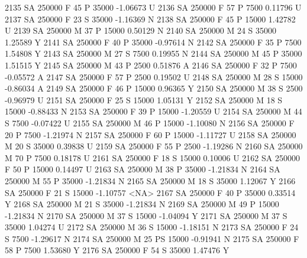 \documentclass{article}
\begin{document}
\begin{Schunk}
\begin{Soutput}
2135     SA     250000   F  45         P  35000  -1.06673    U
2136     SA     250000   F  57         P   7500   0.11796    U
2137     SA     250000   F  23         S  35000  -1.16369    N
2138     SA     250000   F  45         P  15000   1.42782    U
2139     SA     250000   M  37         P  15000   0.50129    N
2140     SA     250000   M  24         S  35000   1.25589    Y
2141     SA     250000   F  40         P  35000  -0.97614    N
2142     SA     250000   F  35         P   7500   1.54808    Y
2143     SA     250000   M  27         S   7500   0.19955    N
2144     SA     250000   M  45         P  35000   1.51515    Y
2145     SA     250000   M  43         P   2500   0.51876    A
2146     SA     250000   F  32         P   7500  -0.05572    A
2147     SA     250000   F  57         P   2500   0.19502    U
2148     SA     250000   M  28         S  15000  -0.86034    A
2149     SA     250000   F  46         P  15000   0.96365    Y
2150     SA     250000   M  38         S   2500  -0.96979    U
2151     SA     250000   F  25         S  15000   1.05131    Y
2152     SA     250000   M  18         S  15000  -0.88433    N
2153     SA     250000   F  39         P  15000  -1.20559    U
2154     SA     250000   M  44         S   7500  -0.07422    U
2155     SA     250000   M  46         P  15000  -1.10080    N
2156     SA     250000   F  20         P   7500  -1.21974    N
2157     SA     250000   F  60         P  15000  -1.11727    U
2158     SA     250000   M  20         S  35000   0.39838    U
2159     SA     250000   F  55         P   2500  -1.19286    N
2160     SA     250000   M  70         P   7500   0.18178    U
2161     SA     250000   F  18         S  15000   0.10006    U
2162     SA     250000   F  50         P  15000   0.14497    U
2163     SA     250000   M  38         P  35000  -1.21834    N
2164     SA     250000   M  55         P  35000  -1.21834    N
2165     SA     250000   M  18         S  35000   1.12067    Y
2166     SA     250000   F  21         S  15000  -1.10757 <NA>
2167     SA     250000   F  40         P  35000   0.33514    Y
2168     SA     250000   M  21         S  35000  -1.21834    N
2169     SA     250000   M  49         P  15000  -1.21834    N
2170     SA     250000   M  37         S  15000  -1.04094    Y
2171     SA     250000   M  37         S  35000   1.04274    U
2172     SA     250000   M  36         S  15000  -1.18151    N
2173     SA     250000   F  24         S   7500  -1.29617    N
2174     SA     250000   M  25        PS  15000  -0.91941    N
2175     SA     250000   F  58         P   7500   1.53680    Y
2176     SA     250000   F  54         S  35000   1.47476    Y

\end{Soutput}
\end{Schunk}
\end{document}
